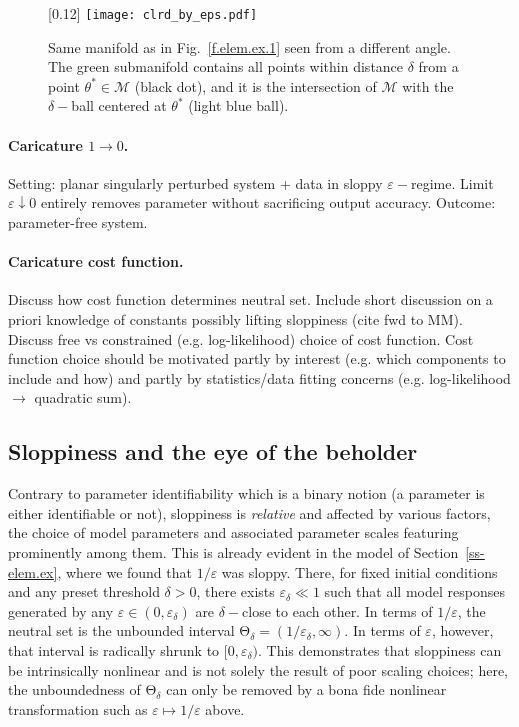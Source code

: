 \documentclass{article}
\newcommand{\M}{\mathcal{M}}
\newcommand{\eps}{\varepsilon}
\newcommand{\p}{\theta}
\newcommand{\omm}{\mathcal{M}}
\newcommand{\ps}{\mathrm{\Theta}}
\begin{document}
%
\begin{figure}[t]
\scalebox{0.24}[0.12]{
\texttt{[image: clrd\_by\_eps.pdf]}
}
\caption{\label{f.elem.ex.2}
Same manifold as in Fig.~\eqref{f.elem.ex.1} seen from a different angle.
The green submanifold contains all points within distance $\delta$ from a point $\p^* \in \omm$ (black dot), and it is the intersection of $\M$ with the $\delta-$ball centered at $\p^*$ (light blue ball).}
\end{figure}
%

{\color{gray}\paragraph{Caricature $1 \rightarrow 0$.}
Setting: planar singularly perturbed system + data in sloppy $\eps-$regime.
Limit $\eps \downarrow 0$ entirely removes parameter without sacrificing output accuracy.
Outcome: parameter-free system.}

{\color{red}\paragraph{Caricature cost function.}
Discuss how cost function determines neutral set.
Include short discussion on a priori knowledge of constants
possibly lifting sloppiness (cite fwd to MM).
Discuss free vs constrained (e.g. log-likelihood) choice of cost function.
Cost function choice should be motivated
partly by interest (e.g. which components to include and how)
and partly by statistics/data fitting concerns
(e.g. log-likelihood $\rightarrow$ quadratic sum).}



\subsection{Sloppiness and the eye of the beholder}
\label{ss-beholder}
%
Contrary to parameter identifiability which is a binary notion (a parameter is either identifiable or not), sloppiness is \emph{relative} and affected by various factors, the choice of model parameters and associated parameter scales featuring prominently among them.
This is already evident in the model of Section~\ref{ss-elem.ex},
where we found that $1/\eps$ was sloppy.
There, for fixed initial conditions and any preset threshold $\delta > 0$, there exists $\eps_\delta \ll 1$ such that all model responses generated by any $\eps \in (0,\eps_\delta)$ are $\delta-$close to each other.
In terms of $1/\eps$, the neutral set is the unbounded interval $\ps_\delta = (1/\eps_\delta,\infty)$.
In terms of $\eps$, however, that interval is radically shrunk to $[0,\eps_\delta)$.
This demonstrates that sloppiness can be intrinsically nonlinear and is not solely the result of poor scaling choices; here, the unboundedness of $\ps_\delta$ can only be removed by a bona fide nonlinear transformation such as $\eps \mapsto 1/\eps$ above.\\
\end{document}
